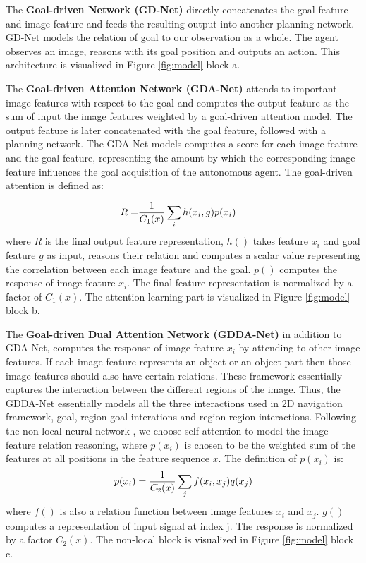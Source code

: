 \documentclass[10pt,twocolumn,letterpaper]{article}
\begin{document}
The \textbf{Goal-driven Network (GD-Net)} directly concatenates the goal feature and image feature and feeds the resulting output into another planning network. GD-Net models the relation of goal to our observation as a whole. The agent observes an image, reasons with its goal position and outputs an action. This architecture is visualized in Figure \ref{fig:model} block a. 

The \textbf{Goal-driven Attention Network (GDA-Net)} attends to important image features with respect to the goal and computes the output feature as the sum of input the image features weighted by a goal-driven attention model. The output feature is later concatenated with the goal feature, followed with a planning network. The GDA-Net models computes a score for each image feature and the goal feature, representing the amount by which the corresponding image feature influences the goal acquisition of the autonomous agent. The goal-driven attention is defined as:

\begin{equation}
\begin{aligned}
    R =&  {1 \over C_1(x)} \sum_i h(x_i, g) p(x_i)
\end{aligned}
\end{equation}
where $R$ is the final output feature representation, $h()$ takes feature $x_i$ and goal feature $g$ as input, reasons their relation and computes a scalar value representing the correlation between each image feature and the goal. $p()$ computes the response of image feature $x_i$. The final feature representation is normalized by a factor of $C_1(x)$. The attention learning part is visualized in Figure \ref{fig:model} block b.

The \textbf{Goal-driven Dual Attention Network (GDDA-Net)}  in addition to GDA-Net, computes the response of image feature $x_i$ by attending to other image features. If each image feature represents an object or an object part  then those image features should also have certain relations. These framework essentially captures the interaction between the different regions of the image. Thus, the GDDA-Net essentially models all the three interactions used in 2D navigation framework, goal, region-goal interations and region-region interactions. Following the non-local neural network \cite{wang_non-local_2017}, we choose self-attention to model the image feature relation reasoning, where $p(x_i)$ is chosen to be the weighted sum of the features at all positions in the feature sequence $x$. The definition of $p(x_i)$ is:
\begin{equation}
    p(x_i) = {1 \over C_2(x)} \sum_j f(x_i, x_j) q(x_j)
\end{equation}
where $f()$ is also a relation function between image features $x_i$ and $x_j$. $g()$ computes a representation of input signal at index j. The response is normalized by a factor $C_2(x)$. The non-local block is visualized in Figure \ref{fig:model} block c.
\end{document}
